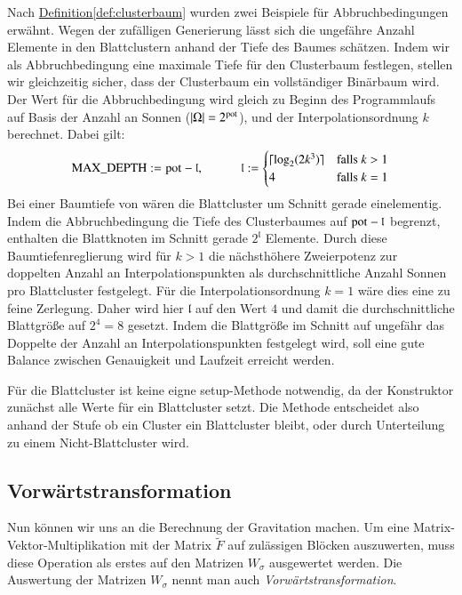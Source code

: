     Nach \hyperref[def:clusterbaum]{Definition}\autoref{def:clusterbaum} wurden zwei Beispiele für Abbruchbedingungen erwähnt. Wegen der zufälligen Generierung lässt sich die ungefähre Anzahl Elemente
    in den Blattclustern anhand der Tiefe des Baumes schätzen. Indem wir als Abbruchbedingung eine maximale Tiefe für den Clusterbaum festlegen, stellen wir gleichzeitig sicher, dass der Clusterbaum
    ein vollständiger Binärbaum wird.
    Der Wert  für die Abbruchbedingung wird gleich zu Beginn des Programmlaufs auf Basis der Anzahl an Sonnen ($|\Omega| = 2^{\tcode{pot}}$), und der Interpolationsordnung $k$ 
    berechnet. Dabei gilt:
    \begin{equation*}
      \tcode{MAX\_DEPTH} := \tcode{pot} - \mathfrak{l}, \ \ \ \ \ \ \ \ \ \ \ \ 
      \mathfrak{l} :=
      \begin{cases}
	\lceil \log_2(2 k^3) \rceil & \text{falls } k > 1\\
	4			    & \text{falls } k = 1
      \end{cases}
    \end{equation*}
    Bei einer Baumtiefe von  wären die Blattcluster um Schnitt gerade einelementig. Indem die Abbruchbedingung die Tiefe des Clusterbaumes auf $\tcode{pot} - \mathfrak{l}$ begrenzt,
    enthalten die Blattknoten im Schnitt gerade $2^\mathfrak{l}$ Elemente.
    Durch diese Baumtiefenreglierung wird für $k > 1$ die nächsthöhere Zweierpotenz zur doppelten Anzahl an Interpolationspunkten als durchschnittliche Anzahl Sonnen pro Blattcluster festgelegt. 
    Für die Interpolationsordnung $k = 1$ wäre dies eine zu feine Zerlegung. Daher wird hier $\mathfrak{l}$  auf den Wert $4$ und damit die durchschnittliche Blattgröße auf $2^4 = 8$ gesetzt.
    Indem die Blattgröße im Schnitt auf ungefähr das Doppelte der Anzahl an Interpolationspunkten festgelegt wird, soll eine gute Balance zwischen Genauigkeit und Laufzeit erreicht werden.
        
    Für die Blattcluster ist keine eigne setup-Methode notwendig, da der Konstruktor \mbox{} zunächst alle Werte für ein Blattcluster setzt. Die Methode \linebreak
    \mbox{\code{\_setup(...)}} entscheidet also anhand der Stufe ob ein Cluster ein Blattcluster bleibt, oder durch Unterteilung zu einem Nicht-Blattcluster wird.

    \subsection{Vorwärtstransformation}
    \label{sec:vorw}
    
    Nun können wir uns an die Berechnung der Gravitation machen.
    Um eine Matrix-Vektor-Multiplikation mit der Matrix $\tilde F$ auf zulässigen Blöcken auszuwerten, muss diese Operation als erstes auf den Matrizen $W_\sigma$ ausgewertet werden.
    Die Auswertung der Matrizen $W_\sigma$ nennt man auch \textit{Vorwärtstransformation}.
    
